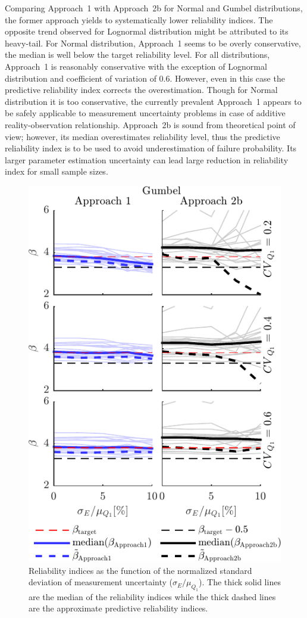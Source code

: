 Comparing Approach~1 with Approach~2b for Normal and Gumbel distributions, the former approach yields to systematically lower reliability indices. The opposite trend observed for Lognormal distribution might be attributed to its heavy-tail. For Normal distribution, Approach~1 seems to be overly conservative, the median is well below the target reliability level. 
For all distributions, Approach~1 is reasonably conservative with the exception of Lognormal distribution and coefficient of variation of 0.6. However, even in this case the predictive reliability index corrects the overestimation. Though for Normal distribution it is too conservative, the currently prevalent Approach~1 appears to be safely applicable to measurement uncertainty problems in case of additive reality-observation relationship. Approach~2b is sound from theoretical point of view; however, its median overestimates reliability level, thus the predictive reliability index is to be used to avoid underestimation of failure probability. Its larger parameter estimation uncertainty can lead large reduction in reliability index for small sample sizes.
\begin{figure}[htbp!] 
	\centering    
	\includegraphics[]{Gumbel_additive_me_beta_smallm_666_median.pdf}
	\caption{Reliability indices as the function of the normalized standard deviation of measurement uncertainty ($\sigma_{E}/\mu_{Q_1}$). The thick solid lines are the median of the reliability indices while the thick dashed lines are the approximate predictive reliability indices.}
	\label{fig:Gumbel_additive_me_beta_smallm}
\end{figure}

